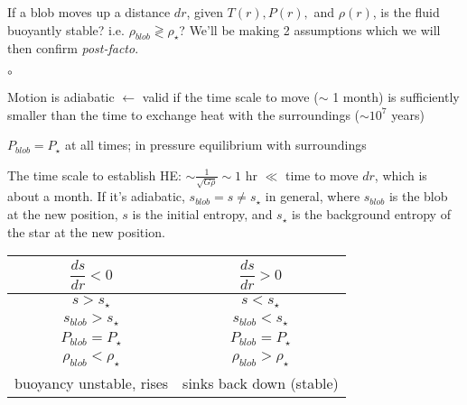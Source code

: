 If a blob moves up a distance $dr$, given $T(r), P(r),$ and $\rho(r)$, is the fluid buoyantly stable? i.e. $\rho_{blob} \gtrless \rho_\star$? We'll be making 2 assumptions which we will then confirm \textit{post-facto}. 
\begin{list}{$\circ$}{}
\item Motion is adiabatic $\leftarrow$ valid if the time scale to move ($\sim$ 1 month) is sufficiently smaller than the time to exchange heat with the surroundings ($\sim10^7$ years)
\item $P_{blob} = P_\star$ at all times; in pressure equilibrium with surroundings
\end{list}

The time scale to establish HE: $\sim\frac{1}{\sqrt{G\rho}} \sim 1 $ hr $\ll$ time to move $dr$, which is about a month. If it's adiabatic, $s_{blob} = s \ne s_\star$ in general, where $s_{blob}$ is the blob at the new position, $s$ is the initial entropy, and $s_\star$ is the background entropy of the star at the new position.\\

\begin{center}
\begin{tabular}{c|c}
\hline
$\dfrac{ds}{dr} < 0$ & $\dfrac{ds}{dr} > 0$\\ \hline
$s>s_\star$ & $s < s_\star$\\ \hline
$s_{blob} > s_\star$ & $s_{blob}< s_\star$\\ \hline
$P_{blob} = P_\star$ & $P_{blob} = P_\star$\\ \hline
$\rho_{blob} < \rho_\star$ & $\rho_{blob} > \rho_\star$ \\ \hline
buoyancy unstable, rises & sinks back down (stable)\\
\hline
\end{tabular}
\end{center}
